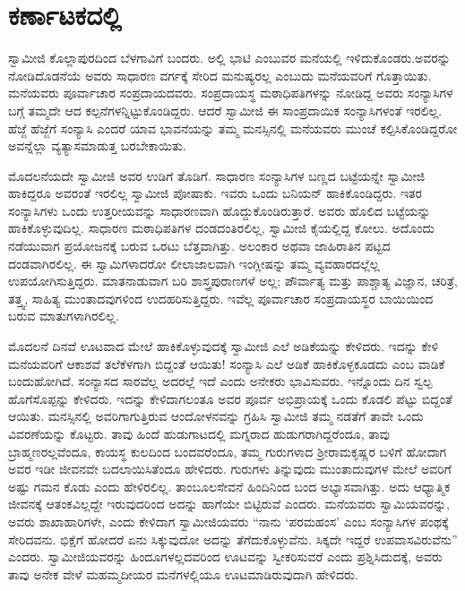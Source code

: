 
\chapter{ಕರ್ಣಾಟಕದಲ್ಲಿ}

 ಸ್ವಾಮೀಜಿ ಕೊಲ್ಲಾಪುರದಿಂದ ಬೆಳಗಾವಿಗೆ ಬಂದರು. ಅಲ್ಲಿ ಭಾಟಿ ಎಂಬುವರ ಮನೆಯಲ್ಲಿ ಇಳಿದುಕೊಂಡರು.ಅವರನ್ನು ನೋಡಿದೊಡನೆಯೆ ಅವರು ಸಾಧಾರಣ ವರ್ಗಕ್ಕೆ ಸೇರಿದ ಮನುಷ್ಯರಲ್ಲ ಎಂಬುದು ಮನೆಯವರಿಗೆ ಗೊತ್ತಾಯಿತು. ಮನೆಯವರು ಪೂರ್ವಾಚಾರ ಸಂಪ್ರದಾಯದವರು. ಸಂಪ್ರದಾಯಸ್ಥ ಮಠಾಧಿಪತಿಗಳನ್ನು ನೋಡಿದ್ದ ಅವರು ಸಂನ್ಯಾಸಿಗಳ ಬಗ್ಗೆ ತಮ್ಮದೇ ಆದ ಕಲ್ಪನೆಗಳನ್ನಿಟ್ಟುಕೊಂಡಿದ್ದರು. ಆದರೆ ಸ್ವಾಮೀಜಿ ಈ ಸಾಂಪ್ರದಾಯಿಕ ಸಂನ್ಯಾಸಿಗಳಂತೆ ಇರಲಿಲ್ಲ. ಹೆಜ್ಜೆ ಹೆಜ್ಜೆಗೆ ಸಂನ್ಯಾಸಿ ಎಂದರೆ ಯಾವ ಭಾವನೆಯನ್ನು ತಮ್ಮ ಮನಸ್ಸಿನಲ್ಲಿ ಮನೆಯವರು ಮುಂಚೆ ಕಲ್ಪಿಸಿಕೊಂಡಿದ್ದರೋ ಅವನ್ನೆಲ್ಲಾ ವ್ಯತ್ಯಾಸಮಾಡುತ್ತ ಬರಬೇಕಾಯಿತು. 

\vskip 2pt

 ಮೊದಲನೆಯದೇ ಸ್ವಾಮೀಜಿ ಅವರ ಉಡಿಗೆ ತೊಡಿಗೆ. ಸಾಧಾರಣ ಸಂನ್ಯಾಸಿಗಳ ಬಣ್ಣದ ಬಟ್ಟೆಯನ್ನೇ ಸ್ವಾಮೀಜಿ ಹಾಕಿದ್ದರೂ ಅವರಂತೆ ಇರಲಿಲ್ಲ ಸ್ವಾಮೀಜಿ ಪೋಷಾಕು. ಇವರು ಒಂದು ಬನಿಯನ್ ಹಾಕಿಕೊಂಡಿದ್ದರು. ಇತರ ಸಂನ್ಯಾಸಿಗಳು ಒಂದು ಉತ್ತರೀಯವನ್ನು ಸಾಧಾರಣವಾಗಿ ಹೊದ್ದುಕೊಂಡಿರುತ್ತಾರೆ. ಅವರು ಹೊಲಿದ ಬಟ್ಟೆಯನ್ನು ಹಾಕಿಕೊಳ್ಳುವುದಿಲ್ಲ. ಸಾಧಾರಣ ಮಠಾಧಿಪತಿಗಳ ದಂಡದಂತಿರಲಿಲ್ಲ, ಸ್ವಾಮೀಜಿ ಕೈಯಲ್ಲಿದ್ದ ಕೋಲು. ಅದೊಂದು ನಡೆಯುವಾಗ ಪ್ರಯೋಜನಕ್ಕೆ ಬರುವ ಒರಟು ಬೆತ್ತವಾಗಿತ್ತು. ಅಲಂಕಾರ ಅಥವಾ ಜಾಹಿರಾತಿನ ಪಟ್ಟದ ದಂಡವಾಗಿರಲಿಲ್ಲ. ಈ ಸ್ವಾಮಿಗಳಾದರೋ ಲೀಲಾಜಾಲವಾಗಿ ಇಂಗ್ಲೀಷನ್ನು ತಮ್ಮ ವ್ಯವಹಾರದಲ್ಲೆಲ್ಲ ಉಪಯೋಗಿಸುತ್ತಿದ್ದರು. ಮಾತನಾಡುವಾಗ ಬರಿ ಶಾಸ್ತ್ರಪುರಾಣಗಳೆ ಅಲ್ಲ; ಪೌರ್ವಾತ್ಯ ಮತ್ತು ಪಾಶ್ಚಾತ್ಯ ವಿಜ್ಞಾನ, ಚರಿತ್ರೆ, ತತ್ತ್ವ, ಸಾಹಿತ್ಯ ಮುಂತಾದವುಗಳಿಂದ ಉದಹರಿಸುತ್ತಿದ್ದರು. ಇವೆಲ್ಲ ಪೂರ್ವಾಚಾರ ಸಂಪ್ರದಾಯಸ್ಥರ ಬಾಯಿಯಿಂದ ಬರುವ ಮಾತುಗಳಾಗಿರಲಿಲ್ಲ. 

\vskip 2pt

 ಮೊದಲನೆ ದಿನವೆ ಊಟವಾದ ಮೇಲೆ ಹಾಕಿಕೊಳ್ಳುವುದಕ್ಕೆ ಸ್ವಾಮೀಜಿ ಎಲೆ ಅಡಿಕೆಯನ್ನು ಕೇಳಿದರು. ಇದನ್ನು ಕೇಳಿ ಮನೆಯವರಿಗೆ ಆಕಾಶವೆ ತಲೆಕೆಳಗಾಗಿ ಬಿದ್ದಂತೆ ಆಯಿತು! ಸಂನ್ಯಾಸಿ ಎಲೆ ಅಡಿಕೆ ಹಾಕಿಕೊಳ್ಳಕೂಡದು ಎಂಬ ವಾಡಿಕೆ ಬಂದುಹೋಗಿದೆ. ಸಂನ್ಯಾಸದ ಸಾರವೆಲ್ಲ ಅದರಲ್ಲೆ ಇದೆ ಎಂದು ಅನೇಕರು ಭಾವಿಸುವರು. ಇನ್ನೊಂದು ದಿನ ಸ್ವಲ್ಪ ಹೊಗೆಸೊಪ್ಪನ್ನು ಕೇಳಿದರು. ಇದನ್ನು ಕೇಳಿದಾಗಲಂತೂ ಅವರ ಪೂರ್ವ ಅಭಿಪ್ರಾಯಕ್ಕೆ ಒಂದು ಕೊಡಲಿ ಪೆಟ್ಟು ಬಿದ್ದಂತೆ ಆಯಿತು. ಮನಸ್ಸಿನಲ್ಲಿ ಅವರಿಗಾಗುತ್ತಿರುವ ಆಂದೋಳನವನ್ನು ಗ್ರಹಿಸಿ ಸ್ವಾಮೀಜಿ ತಮ್ಮ ನಡತೆಗೆ ತಾವೇ ಒಂದು ವಿವರಣೆಯನ್ನು ಕೊಟ್ಟರು. ತಾವು ಹಿಂದೆ ಹುಡುಗಾಟದಲ್ಲಿ ಮಗ್ನರಾದ ಹುಡುಗರಾಗಿದ್ದರೆಂದೂ, ತಾವು ಬ್ರಾಹ್ಮಣರಲ್ಲವೆಂದೂ, ಕಾಯಸ್ಥ ಕುಲದಿಂದ ಬಂದವರೆಂದೂ, ತಮ್ಮ ಗುರುಗಳಾದ ಶ‍್ರೀರಾಮಕೃಷ್ಣರ ಬಳಿಗೆ ಹೋದಾಗ ಅವರ ಇಡೀ ಜೀವನವೇ ಬದಲಾಯಿಸಿತೆಂದೂ ಹೇಳಿದರು. ಗುರುಗಳು ತಿನ್ನುವುದು ಮುಂತಾದುವುಗಳ ಮೇಲೆ ಅವರಿಗೆ ಅಷ್ಟು ಗಮನ ಕೊಡು ಎಂದು ಹೇಳಿರಲಿಲ್ಲ. ತಾಂಬೂಲಸೇವನೆ ಹಿಂದಿನಿಂದ ಬಂದ ಅಭ್ಯಾಸವಾಗಿತ್ತು. ಅದು ಆಧ್ಯಾತ್ಮಿಕ ಜೀವನಕ್ಕೆ ಆತಂಕವಿಲ್ಲದ್ದೇ ಇರುವುದರಿಂದ ಅದನ್ನು ಹಾಗೆಯೇ ಬಿಟ್ಟಿರುವೆ ಎಂದರು. ಮನೆಯವರು ಸ್ವಾಮಿಯವರನ್ನು, ಅವರು ಶಾಖಾಹಾರಿಗಳೇ, ಎಂದು ಕೇಳಿದಾಗ ಸ್ವಾಮೀಜಿಯವರು “ನಾನು ‘ಪರಮಹಂಸ’ ಎಂಬ ಸಂನ್ಯಾಸಿಗಳ ಪಂಥಕ್ಕೆ ಸೇರಿದವನು. ಭಿಕ್ಷೆಗೆ ಹೋದರೆ ಏನು ಸಿಕ್ಕುವುದೋ ಅದನ್ನು ತೆಗೆದುಕೊಳ್ಳುವೆನು. ಸಿಕ್ಕದೇ ಇದ್ದರೆ ಉಪವಾಸವಿರುವೆನು” ಎಂದರು. ಸ್ವಾಮೀಜಿಯವರನ್ನು ಹಿಂದೂಗಳಲ್ಲದವರಿಂದ ಊಟವನ್ನು ಸ್ವೀಕರಿಸುವರೆ ಎಂದು ಪ್ರಶ್ನಿಸಿದುದಕ್ಕೆ, ಅವರು ತಾವು ಅನೇಕ ವೇಳೆ ಮಹಮ್ಮದೀಯರ ಮನೆಗಳಲ್ಲಿಯೂ ಊಟಮಾಡಿರುವುದಾಗಿ ಹೇಳಿದರು. 

